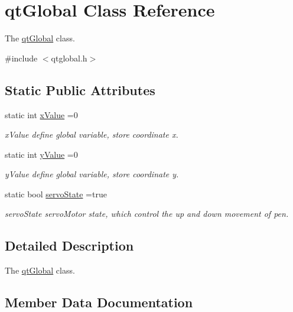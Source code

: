 \hypertarget{classqt_global}{}\section{qt\+Global Class Reference}
\label{classqt_global}


The \mbox{\hyperlink{classqt_global}{qt\+Global}} class.  




{\ttfamily \#include $<$qtglobal.\+h$>$}

\subsection*{Static Public Attributes}
\begin{DoxyCompactItemize}
\item 
static int \mbox{\hyperlink{classqt_global_af799abd19955f1153c053c419f2d81da}{x\+Value}} =0
\begin{DoxyCompactList}\small\item\em x\+Value define global variable, store coordinate x. \end{DoxyCompactList}\item 
static int \mbox{\hyperlink{classqt_global_acf4d282719f7792728eb450ba35a5d08}{y\+Value}} =0
\begin{DoxyCompactList}\small\item\em y\+Value define global variable, store coordinate y. \end{DoxyCompactList}\item 
\mbox{\label{classqt_global_afe9e710a5d12c96e6b83cbe4a6977f76}} 
static bool \mbox{\hyperlink{classqt_global_afe9e710a5d12c96e6b83cbe4a6977f76}{servo\+State}} =true
\begin{DoxyCompactList}\small\item\em servo\+State servo\+Motor state, which control the up and down movement of pen. \end{DoxyCompactList}\end{DoxyCompactItemize}


\subsection{Detailed Description}
The \mbox{\hyperlink{classqt_global}{qt\+Global}} class. 

\subsection{Member Data Documentation}
\mbox{\label{classqt_global_af799abd19955f1153c053c419f2d81da}} 

